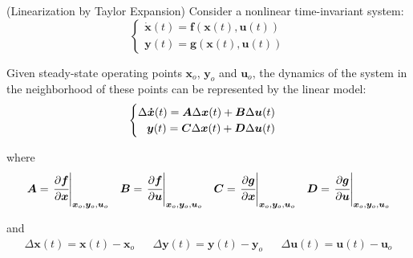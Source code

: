 \documentclass[a4paper,11pt]{book}
\numberwithin{figure}{chapter}
\numberwithin{equation}{chapter}
\numberwithin{table}{chapter}
\newtheorem{theorem}{Theorem}[chapter]
\theoremstyle{definition}
\newcounter{boxed-theorem}
\newenvironment{boxed-theorem}[1]
{\begin{shaded} \begin{theorem}{#1}}
{\end{theorem} \end{shaded}}
\newcounter{boxed-definition}
\begin{document}
\begin{boxed-theorem}{(Linearization by Taylor Expansion)}
	Consider a nonlinear time-invariant system:
	\begin{equation} \label{eq:SSRepr03}
	\begin{cases}
		\dot{\bm{x}}(t) = \bm{f}(\bm{x}(t), \bm{u}(t)) \\
		\bm{y}(t) = \bm{g}(\bm{x}(t), \bm{u}(t))
	\end{cases}
	\end{equation}
	
\noindent Given steady-state operating points $\bm{x}_o$, $\bm{y}_o$ and $\bm{u}_o$, the dynamics of the system in the neighborhood of these points can be represented by the linear model: 
	\begin{align}
	\begin{cases}
		\Delta \bm{\dot{x}}(t) = \bm{A}\Delta \bm{x}(t) + \bm{B}\Delta \bm{u}(t) & \\
		\hfill \bm{y}(t) = \bm{C}\Delta \bm{x}(t) + \bm{D}\Delta \bm{u}(t) &
	\end{cases}
	\end{align}
	
	\noindent where
	\begin{equation}
	\begin{matrix}
		\bm{A} = \left. \cfrac{\partial \bm{f}}{\partial \bm{x}} \right|_{\bm{x}_o, \bm{y}_o, \bm{u}_o} & \bm{B} = \left. \cfrac{\partial \bm{f}}{\partial \bm{u}} \right|_{\bm{x}_o, \bm{y}_o, \bm{u}_o} & \bm{C} = \left. \cfrac{\partial \bm{g}}{\partial \bm{x}} \right|_{\bm{x}_o, \bm{y}_o, \bm{u}_o} & \bm{D} = \left. \cfrac{\partial \bm{g}}{\partial \bm{u}} \right|_{\bm{x}_o, \bm{y}_o, \bm{u}_o} 
	\end{matrix}
	\end{equation}
	
	\noindent and
	\begin{equation}
	\begin{matrix}
		\Delta \bm{x}(t) = \bm{x}(t) - \bm{x}_o & & \Delta \bm{y}(t) = \bm{y}(t) - \bm{y}_o & & \Delta \bm{u}(t) = \bm{u}(t) - \bm{u}_o
	\end{matrix}
	\end{equation}
\end{boxed-theorem}
\end{document}
